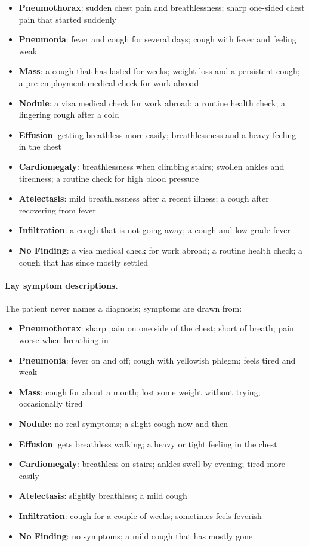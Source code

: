 \begin{itemize}[leftmargin=*,itemsep=1pt]\item \textbf{Pneumothorax}: sudden chest pain and breathlessness; sharp one-sided chest pain that started suddenly\item \textbf{Pneumonia}: fever and cough for several days; cough with fever and feeling weak\item \textbf{Mass}: a cough that has lasted for weeks; weight loss and a persistent cough; a pre-employment medical check for work abroad\item \textbf{Nodule}: a visa medical check for work abroad; a routine health check; a lingering cough after a cold\item \textbf{Effusion}: getting breathless more easily; breathlessness and a heavy feeling in the chest\item \textbf{Cardiomegaly}: breathlessness when climbing stairs; swollen ankles and tiredness; a routine check for high blood pressure\item \textbf{Atelectasis}: mild breathlessness after a recent illness; a cough after recovering from fever\item \textbf{Infiltration}: a cough that is not going away; a cough and low-grade fever\item \textbf{No Finding}: a visa medical check for work abroad; a routine health check; a cough that has since mostly settled\end{itemize}

\paragraph{Lay symptom descriptions.} The patient never names a diagnosis; symptoms are drawn from:

\begin{itemize}[leftmargin=*,itemsep=1pt]\item \textbf{Pneumothorax}: sharp pain on one side of the chest; short of breath; pain worse when breathing in\item \textbf{Pneumonia}: fever on and off; cough with yellowish phlegm; feels tired and weak\item \textbf{Mass}: cough for about a month; lost some weight without trying; occasionally tired\item \textbf{Nodule}: no real symptoms; a slight cough now and then\item \textbf{Effusion}: gets breathless walking; a heavy or tight feeling in the chest\item \textbf{Cardiomegaly}: breathless on stairs; ankles swell by evening; tired more easily\item \textbf{Atelectasis}: slightly breathless; a mild cough\item \textbf{Infiltration}: cough for a couple of weeks; sometimes feels feverish\item \textbf{No Finding}: no symptoms; a mild cough that has mostly gone\end{itemize}

